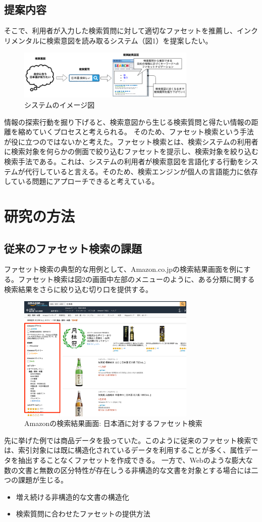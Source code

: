 \documentclass[a4j,10pt, twocolumn]{jarticle} \usepackage[dvipdfmx]{graphicx} \usepackage{amssymb} \usepackage{amsmath}
\begin{document}
\subsection{提案内容}

 そこで、利用者が入力した検索質問に対して適切なファセットを推薦し、インクリメンタルに検索意図を読み取るシステム（図1）を提案したい。

 \begin{figure}[h]
   \includegraphics[width=85mm]{./new_ir_with_navi.png}
   \caption{システムのイメージ図}
 \end{figure}
 
 情報の探索行動を掘り下げると、検索意図から生じる検索質問と得たい情報の距離を縮めていくプロセスと考えられる。 そのため、ファセット検索という手法が役に立つのではないかと考えた。ファセット検索とは、検索システムの利用者に検索対象を何らかの側面で絞り込むファセットを提示し、検索対象を絞り込む検索手法である\cite{faceted}。これは、システムの利用者が検索意図を言語化する行動をシステムが代行していると言える。そのため、検索エンジンが個人の言語能力に依存している問題にアプローチできると考えている。
\section{研究の方法}
\subsection{従来のファセット検索の課題}
 ファセット検索の典型的な用例として、Amazon.co.jp\cite{amazon}の検索結果画面を例にする。ファセット検索は図2の画面中左部のメニューのように、ある分類に関する検索結果をさらに絞り込む切り口を提供する。
 \begin{figure}[h]
   \includegraphics[width=85mm]{./amazon.png}
   \caption{Amazonの検索結果画面: 日本酒に対するファセット検索}
 \end{figure}
  先に挙げた例では商品データを扱っていた。このように従来のファセット検索では、索引対象には既に構造化されているデータを利用することが多く、属性データを抽出することなくファセットを作成できる。
  一方で、Webのような膨大な数の文書と無数の区分特性が存在しうる非構造的な文書を対象とする場合には二つの課題が生じる。
\begin{itemize}
  \item 増え続ける非構造的な文書の構造化
  \item 検索質問に合わせたファセットの提供方法
\end{itemize}
\end{document}
